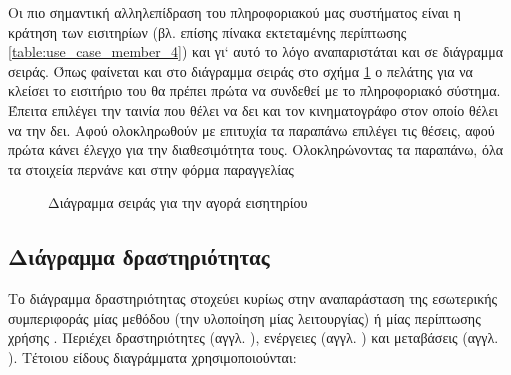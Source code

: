 \documentclass{assignment}
\begin{document}
Οι πιο σημαντική αλληλεπίδραση του πληροφοριακού μας συστήματος είναι η κράτηση των εισιτηρίων (βλ. επίσης πίνακα εκτεταμένης περίπτωσης \ref{table:use_case_member_4}) και γι` αυτό το λόγο αναπαριστάται και σε διάγραμμα σειράς. Όπως φαίνεται και στο διάγραμμα σειράς στο σχήμα \ref{fig:sequence_ticket} ο πελάτης για να κλείσει το εισιτήριο του θα πρέπει πρώτα να συνδεθεί με το πληροφοριακό σύστημα. Έπειτα επιλέγει την ταινία που θέλει να δει και τον κινηματογράφο στον οποίο θέλει να την δει. Αφού ολοκληρωθούν με επιτυχία τα παραπάνω επιλέγει τις θέσεις, αφού πρώτα κάνει έλεγχο για την διαθεσιμότητα τους. Ολοκληρώνοντας τα παραπάνω, όλα τα στοιχεία περνάνε και στην φόρμα παραγγελίας 

\begin{landscape}
\begin{figure}
\begin{center}
\caption{Διάγραμμα σειράς για την αγορά εισητηρίου}
\label{fig:sequence_ticket}
\end{center}
\end{figure}
\end{landscape}

\subsection{Διάγραμμα δραστηριότητας}

Το διάγραμμα δραστηριότητας στοχεύει κυρίως στην αναπαράσταση της εσωτερικής συμπεριφοράς μίας μεθόδου (την υλοποίηση μίας λειτουργίας) ή μίας περίπτωσης χρήσης \cite{virvou_uml}. Περιέχει δραστηριότητες (αγγλ. ), ενέργειες (αγγλ. ) και μεταβάσεις (αγγλ. ). Τέτοιου είδους διαγράμματα χρησιμοποιούνται:
\end{document}
